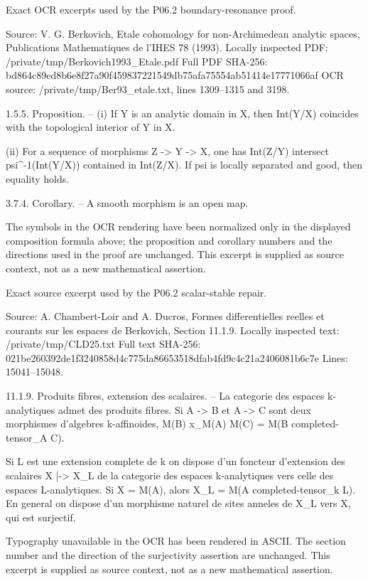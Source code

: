 Exact OCR excerpts used by the P06.2 boundary-resonance proof.

Source: V. G. Berkovich, Etale cohomology for non-Archimedean analytic
spaces, Publications Mathematiques de l'IHES 78 (1993).
Locally inspected PDF: /private/tmp/Berkovich1993_Etale.pdf
Full PDF SHA-256: bd864c89ed8b6e8f27a90f459837221549db75afa75554ab51414e17771066af
OCR source: /private/tmp/Ber93_etale.txt, lines 1309--1315 and 3198.

1.5.5. Proposition. -- (i) If Y is an analytic domain in X, then Int(Y/X)
coincides with the topological interior of Y in X.

(ii) For a sequence of morphisms Z -> Y -> X, one has
Int(Z/Y) intersect psi^{-1}(Int(Y/X)) contained in Int(Z/X).
If psi is locally separated and good, then equality holds.

3.7.4. Corollary. -- A smooth morphism is an open map.

The symbols in the OCR rendering have been normalized only in the displayed
composition formula above; the proposition and corollary numbers and the
directions used in the proof are unchanged.  This excerpt is supplied as
source context, not as a new mathematical assertion.

Exact source excerpt used by the P06.2 scalar-stable repair.

Source: A. Chambert-Loir and A. Ducros, Formes differentielles reelles et
courants sur les espaces de Berkovich, Section 11.1.9.
Locally inspected text: /private/tmp/CLD25.txt
Full text SHA-256: 021be260392de1f3240858d4c775da86653518dfab4fd9c4c21a2406081b6c7e
Lines: 15041--15048.

11.1.9. Produits fibres, extension des scalaires. -- La categorie des espaces
k-analytiques admet des produits fibres. Si A -> B et A -> C sont deux
morphismes d'algebres k-affinoides,
M(B) x_{M(A)} M(C) = M(B completed-tensor_A C).

Si L est une extension complete de k on dispose d'un foncteur d'extension
des scalaires X |-> X_L de la categorie des espaces k-analytiques vers celle
des espaces L-analytiques. Si X = M(A), alors
X_L = M(A completed-tensor_k L). En general on dispose d'un morphisme naturel
de sites anneles de X_L vers X, qui est surjectif.

Typography unavailable in the OCR has been rendered in ASCII.  The section
number and the direction of the surjectivity assertion are unchanged.  This
excerpt is supplied as source context, not as a new mathematical assertion.

